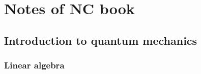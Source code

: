 \documentclass[
	11pt, %
	a4paper, %
]{LegrandOrangeBook}
\begin{document}


\pagestyle{empty} %

\tableofcontents %



\pagestyle{fancy} %

\cleardoublepage %


\chapterspaceabove{6.75cm} %
\chapterspacebelow{7.25cm} %


 



\part{Notes of NC book}

\chapter{Introduction to quantum mechanics}

\section{Linear algebra} %
\end{document}
